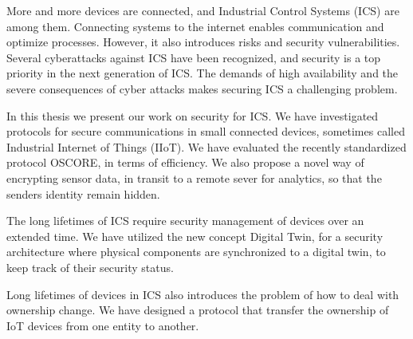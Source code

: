 More and more devices are connected, and Industrial Control Systems (ICS) are among them. Connecting systems to the internet enables communication and optimize processes. However, it also introduces risks and security vulnerabilities. Several cyberattacks against ICS have been recognized, and security is a top priority in the next generation of ICS. The demands of high availability and the severe consequences of cyber attacks makes securing ICS a challenging problem.

In this thesis we present our work on security for ICS. We have investigated protocols for secure communications in small connected devices, sometimes called Industrial Internet of Things (IIoT). We have evaluated the recently standardized protocol OSCORE, in terms of efficiency. 
We also propose a novel way of encrypting sensor data, in transit to a remote sever for analytics, so that the senders identity remain hidden.

The long lifetimes of ICS require security management of devices over an extended time. We have utilized the new concept Digital Twin, for a security architecture where physical components are synchronized to a digital twin, to keep track of their security status.

Long lifetimes of devices in ICS also introduces the problem of how to deal with ownership change. We have designed a protocol that transfer the ownership of IoT devices from one entity to another.

